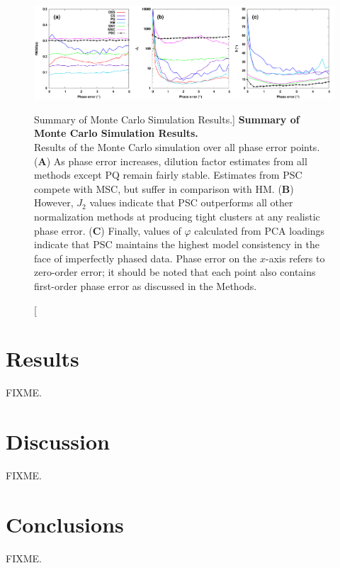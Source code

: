 \begin{figure}[ht!]
\includegraphics[width=6.5in]{figs/pscorr/04-montecarlo.png}
\caption
      [Summary of Monte Carlo Simulation Results.]{
  {\bf Summary of Monte Carlo Simulation Results.}
  \\
  Results of the Monte Carlo simulation over all phase error points.
  ({\bf A}) As phase error increases, dilution factor estimates from all
  methods except PQ remain fairly stable. Estimates from PSC compete with
  MSC, but suffer in comparison with HM.
  ({\bf B}) However, $J_2$ values indicate that PSC outperforms all other
  normalization methods at producing tight clusters at any realistic
  phase error.
  ({\bf C}) Finally, values of $\varphi$ calculated from PCA loadings indicate
  that PSC maintains the highest model consistency in the face of imperfectly
  phased data. Phase error on the $x$-axis refers to zero-order error; it
  should be noted that each point also contains first-order phase error as
  discussed in the Methods.
}
\end{figure}

\section{Results}

\begin{doublespace}
FIXME.
\end{doublespace}

\section{Discussion}

\begin{doublespace}
FIXME.
\end{doublespace}

\section{Conclusions}

\begin{doublespace}
FIXME.
\end{doublespace}




